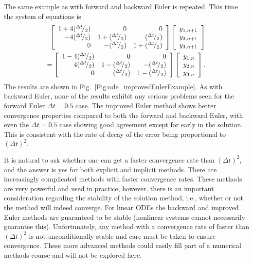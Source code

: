 The same example as with forward and backward Euler is repeated. This time the system of equations is 
\begin{align}
  \left[ \begin{array}{r r r}
   1 + 4( \rfrac{\Delta t}{2} ) &                            0 &                            0 \\
      -4( \rfrac{\Delta t}{2} ) &  1 + ( \rfrac{\Delta t}{2} ) &      ( \rfrac{\Delta t}{2} ) \\
                              0 &     -( \rfrac{\Delta t}{2} ) &  1 + ( \rfrac{\Delta t}{2} ) \\ \end{array} \right]  
  \left[ \begin{array}{c} y_{1,n+1} \\ y_{2,n+1} \\ y_{3,n+1} \end{array} \right] \nonumber \\
  =  \left[ \begin{array}{r r r}
   1 - 4( \rfrac{\Delta t}{2} ) &                            0 &                            0 \\
       4( \rfrac{\Delta t}{2} ) &  1 - ( \rfrac{\Delta t}{2} ) &     -( \rfrac{\Delta t}{2} ) \\
                              0 &      ( \rfrac{\Delta t}{2} ) &  1 - ( \rfrac{\Delta t}{2} ) \\ \end{array} \right]
  \left[ \begin{array}{c} y_{1,n} \\ y_{2,n} \\ y_{3,n} \end{array} \right] .
\end{align}
The results are shown in Fig.~\ref{Fig:ode_improvedEulerExample}. As with backward Euler, none of the results exhibit any serious problems seen for the forward Euler $\Delta t = 0.5$ case. The improved Euler method shows better convergence properties compared to both the forward and backward Euler, with even the $\Delta t = 0.5$ case showing good agreement except for early in the solution. This is consistent with the rate of decay of the error being proportional to $(\Delta t)^2$.

It is natural to ask whether one can get a faster convergence rate than $(\Delta t)^2$, and the answer is yes for both explicit and implicit methods. There are increasingly complicated methods with faster convergence rates. These methods are very powerful and used in practice, however, there is an important consideration regarding the stability of the solution method, i.e., whether or not the method will indeed converge. For linear ODEs the backward and improved Euler methods are guaranteed to be stable (nonlinear systems cannot necessarily guarantee this). Unfortunately, any method with a convergence rate of faster than $(\Delta t)^2$ is not unconditionally stable and care must be taken to ensure convergence. These more advanced methods could easily fill part of a numerical methods course and will not be explored here.

